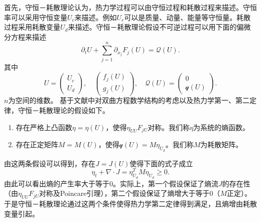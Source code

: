 	首先，守恒－耗散理论认为，热力学过程可以由守恒过程和耗散过程来描述。守恒率可以采用守恒变量$U_c$来描述。例如$U_c$可以是质量、动量、能量等守恒量。耗散过程采用耗散变量$U_d$来描述。守恒－耗散理论假设不可逆过程可以用下面的偏微分方程来描述
	\begin{equation}\label{eq:CDF}
		\partial_t U + \sum_{j=1}^n \partial_{x_j} F_j(U) = \mathcal{Q} (U) .
	\end{equation}
	其中
	\begin{equation*}
		U = \left( \begin{array}{c}
			U_c \\ U_d 
			\end{array} \right) , \quad
			 \left( \begin{array}{c}
			f_j(U) \\ g_j(U)
			\end{array} \right), \quad 
			\mathcal{Q}(U) = \left( \begin{array}{c}
			0 \\ \mathcal{q} (U) 
			\end{array} \right).
	\end{equation*}
	$n$为空间的维数。
	基于文献\cite{yong1999singular,yang2015validity,yong2008interesting}中对双曲方程数学结构的考虑以及热力学第一、第二定律，守恒－耗散理论的假设如下\cite{zhu2014conservation}。
	\begin{enumerate}
		\item 存在严格上凸函数$\eta = \eta (U)$，使得$\eta_{UU} F_{jU}$对称。我们称$\eta$为系统的熵函数。
		\item 存在正定矩阵$M = M(U)$，使得$\mathcal{q}(U) = M \eta_{U_d}$。我们称$M$为耗散矩阵。
	\end{enumerate}
	由这两条假设可以得到，存在$J = J(U)$使得下面的式子成立
	\begin{equation*}
		\eta_t + \nabla \cdot J = \eta_{U_d}^T M \eta_{U_d} \ge 0.
	\end{equation*}
	由此可以看出熵的产生率大于等于0。实际上，第一个假设保证了熵流$J$的存在性（由$\eta_{UU} F_{jU}$对称及Poincare引理），第二个假设保证了熵增大于等于0（$M$正定）。于是守恒－耗散理论通过这两个条件使得热力学第二定律得到满足，且熵增由耗散变量引起\cite{zhu2014conservation}。
	
